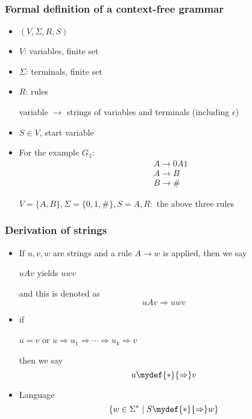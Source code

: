 \begin{frame}[allowframebreaks]
  \frametitle{Formal definition of a context-free
    grammar}
    \begin{itemize}
\item $(V,\Sigma, R, S)$

\item [] $V$: variables, finite set

\item [] $\Sigma$: terminals, finite set

\item [] $R$: rules
\begin{center}
  variable
$\rightarrow$ strings of variables and
terminals (including $\epsilon$)
\end{center}

\item $S\in V$, start variable

\item For the example $G_1$:
\begin{eqnarray*}
  && A \rightarrow 0A1\\
&& A \rightarrow B\\
&& B \rightarrow \#
\end{eqnarray*}

$V=\{A,B\}, \Sigma=\{0,1,\#\}, S = A, R:$
the above three rules
\end{itemize}
\end{frame}

\begin{frame}[allowframebreaks]
  \frametitle{Derivation of strings}
    \begin{itemize}
\item If $u,v,w$ are strings and a rule  $A \rightarrow
w$ is applied, then we say
\begin{center}
$uAv$ yields $uwv$
\end{center}
and this is denoted as
\begin{equation*}
uAv \Rightarrow uwv
\end{equation*}
\item if 
  \begin{center}
$u=v$ or 
$u \Rightarrow u_1 \Rightarrow \cdots \Rightarrow
u_k \Rightarrow v$
\end{center}
then we say
\begin{equation*}
u \mydef{*}{\Rightarrow} v 
\end{equation*}
\item Language
  \begin{equation*}
\{ w \in \Sigma^*\mid 
S \mydef{*}{\Rightarrow} w\}
\end{equation*}
\end{itemize}\end{frame} 

